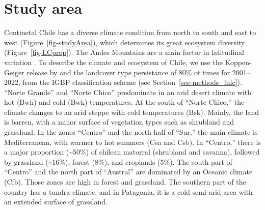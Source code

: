 \documentclass[
  number,
  preprint,
  3p,
  onecolumn]{elsarticle}
\begin{document}
\hypertarget{study-area}{%
\section{Study area}\label{study-area}}

Continetal Chile has a diverse climate condition from north to south and
east to west \citep{Aceituno2021} (Figure~\ref{fig-studyArea}), which
determines its great ecosystem diversity (Figure~\ref{fig-LCprop}). The
Andes Mountains are a main factor in latitudinal variation
\citep{Garreaud2009}. To describe the climate and ecosystem of Chile, we
use the Koppen-Geiger release by \citep{Beck2023} and the landcover type
persistance of 80\% of times for 2001--2022, from the IGBP
classification scheme \citep{Friedl2019} (see
Section~\ref{sec-methods_lulc}). ``Norte Grande'' and ``Norte Chico''
predominate in an arid desert climate with hot (Bwh) and cold (Bwk)
temperatures. At the south of ``Norte Chico,'' the climate changes to an
arid steppe with cold temperatures (Bsk). Mainly, the land is barren,
with a minor surface of vegetation types such as shrubland and
grassland. In the zones ``Centro'' and the north half of ``Sur,'' the
main climate is Mediterranean, with warmer to hot summers (Csa and Csb).
In ``Centro,'' there is a major proportion (\textasciitilde50\%) of
chilean matorral (shrubland and savanna), followed by grassland
(\textasciitilde16\%), forest (8\%), and croplands (5\%). The south part
of ``Centro'' and the north part of ``Austral'' are dominated by an
Oceanic climate (Cfb). Those zones are high in forest and grassland. The
southern part of the country has a tundra climate, and in Patagonia, it
is a cold semi-arid area with an extended surface of grassland.
\end{document}
